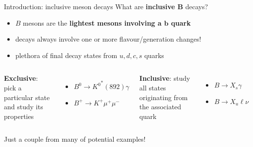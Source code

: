\documentclass[xcolor=dvipsnames]{beamer}
\begin{document}
\begin{frame}{Introduction: inclusive \safeB meson decays}
   \centering\scriptsize
   {\normalsize What are \textbf{inclusive $\bm{B}$} decays?}

   \vspace{10pt}

   \begin{itemize}
      \item $B$ mesons are the \textbf{lightest mesons involving a $\bm{b}$ quark}
      \item[\ra] decays always involve one or more flavour/generation changes!
      \item[\ra] plethora of final decay states from $u, d, c, s$ quarks
   \end{itemize}

   \vspace{10pt}

   \begin{columns}
      \centering
         \textbf{Exclusive}: pick a particular state and study its properties
            \begin{itemize}
               \item $B^0\to{K^0}^*(892)\gamma$
               \item $B^+\to K^+\mu^+\mu^-$
            \end{itemize}
      \centering
         \textbf{Inclusive}: study all states originating from the associated quark
         \begin{itemize}
            \item $B\to X_s \gamma$
            \item $B\to X_u \ell \nu$
         \end{itemize}
   \end{columns}
   
   \vspace{10pt}
   Just a couple from many of potential examples!

\end{frame}
\end{document}
